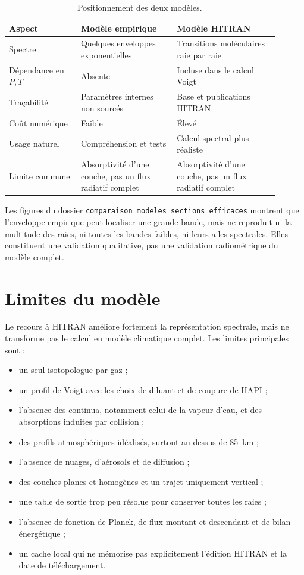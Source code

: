 \documentclass[11pt,a4paper]{article}
\newcommand{\code}[1]{\texttt{#1}}
\begin{document}
\begin{table}[ht]
\centering
\small
\begin{tabular}{p{0.24\linewidth}p{0.32\linewidth}p{0.34\linewidth}}
\toprule
Aspect & Modèle empirique & Modèle HITRAN \\
\midrule
Spectre & Quelques enveloppes exponentielles & Transitions moléculaires raie
par raie \\
Dépendance en $P,T$ & Absente & Incluse dans le calcul Voigt \\
Traçabilité & Paramètres internes non sourcés & Base et publications HITRAN \\
Coût numérique & Faible & Élevé \\
Usage naturel & Compréhension et tests & Calcul spectral plus réaliste \\
Limite commune & Absorptivité d'une couche, pas un flux radiatif complet &
Absorptivité d'une couche, pas un flux radiatif complet \\
\bottomrule
\end{tabular}
\caption{Positionnement des deux modèles.}
\end{table}

Les figures du dossier \code{comparaison\_modeles\_sections\_efficaces}
montrent que l'enveloppe empirique peut localiser une grande bande, mais ne
reproduit ni la multitude des raies, ni toutes les bandes faibles, ni leurs
ailes spectrales. Elles constituent une validation qualitative, pas une
validation radiométrique du modèle complet.

\section{Limites du modèle}

Le recours à HITRAN améliore fortement la représentation spectrale, mais ne
transforme pas le calcul en modèle climatique complet. Les limites
principales sont :

\begin{itemize}[itemsep=2pt]
  \item un seul isotopologue par gaz ;
  \item un profil de Voigt avec les choix de diluant et de coupure de HAPI ;
  \item l'absence des continua, notamment celui de la vapeur d'eau, et des
        absorptions induites par collision ;
  \item des profils atmosphériques idéalisés, surtout au-dessus de
        \SI{85}{\kilo\metre} ;
  \item l'absence de nuages, d'aérosols et de diffusion ;
  \item des couches planes et homogènes et un trajet uniquement vertical ;
  \item une table de sortie trop peu résolue pour conserver toutes les raies ;
  \item l'absence de fonction de Planck, de flux montant et descendant et de
        bilan énergétique ;
  \item un cache local qui ne mémorise pas explicitement l'édition HITRAN et
        la date de téléchargement.
\end{itemize}
\end{document}
